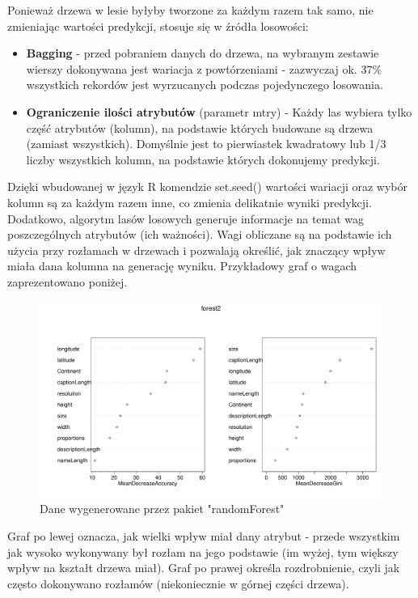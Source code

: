 \documentclass[a4paper,twoside]{article}
\begin{document}
Ponieważ drzewa w lesie byłyby tworzone za każdym razem tak samo, nie zmieniając wartości predykcji, stosuje się w źródła losowości:
\begin{itemize}
	\item \textbf{Bagging} - przed pobraniem danych do drzewa, na wybranym zestawie wierszy dokonywana jest wariacja z powtórzeniami - zazwyczaj ok. 37\% wszystkich rekordów jest wyrzucanych podczas pojedynczego losowania.
	\item \textbf{Ograniczenie ilości atrybutów} (parametr mtry) - Każdy las wybiera tylko część atrybutów (kolumn), na podstawie których budowane są drzewa (zamiast wszystkich). Domyślnie jest to pierwiastek kwadratowy lub 1/3 liczby wszystkich kolumn, na podstawie których dokonujemy predykcji.
\end{itemize}

Dzięki wbudowanej w język R komendzie set.seed() wartości  wariacji oraz wybór kolumn są za każdym razem inne, co zmienia delikatnie wyniki predykcji. \\

Dodatkowo, algorytm lasów losowych generuje informacje na temat wag poszczególnych atrybutów (ich ważności). Wagi obliczane są na podstawie ich użycia przy rozłamach w drzewach i pozwalają określić, jak znaczący wpływ miała dana kolumna na generację wyniku. Przykładowy graf o wagach zaprezentowano poniżej.

\begin{figure}[h!]
	\centering
	\includegraphics[width=1\textwidth]{./img/Rplot03.pdf}
	\caption{Dane wygenerowane przez pakiet "randomForest"}
\end{figure}

\newpage

Graf po lewej oznacza, jak wielki wpływ miał dany atrybut - przede wszystkim jak wysoko wykonywany był rozłam na jego podstawie (im wyżej, tym większy wpływ na kształt drzewa miał). Graf po prawej określa rozdrobnienie, czyli jak często dokonywano rozłamów (niekoniecznie w górnej części drzewa).
\end{document}
